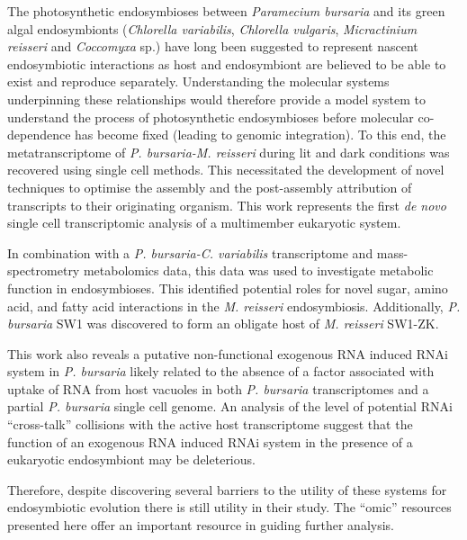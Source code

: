 The photosynthetic endosymbioses between \textit{Paramecium bursaria} and its green algal endosymbionts 
(\textit{Chlorella variabilis}, \textit{Chlorella vulgaris}, \textit{Micractinium reisseri} and \textit{Coccomyxa} sp.) 
have long been suggested to represent nascent endosymbiotic interactions 
as host and endosymbiont are believed to be able to exist and reproduce separately. 
Understanding the molecular systems underpinning these relationships would therefore 
provide a model system to understand the process of photosynthetic endosymbioses 
before molecular co-dependence has become fixed (leading to genomic integration).
To this end, the metatranscriptome of \textit{P. bursaria-M. reisseri} during 
lit and dark conditions was recovered using single cell methods. 
This necessitated the development of novel techniques to optimise the 
assembly and the post-assembly attribution of transcripts to their originating organism. 
This work represents the first \textit{de novo} single cell transcriptomic analysis of a multimember eukaryotic system.  


In combination with a \textit{P. bursaria-C. variabilis} transcriptome and 
mass-spectrometry metabolomics data, 
this data was used to investigate metabolic function in endosymbioses. 
This identified potential roles for novel sugar, amino acid, and 
fatty acid interactions in the \textit{M. reisseri} endosymbiosis.
Additionally, \textit{P. bursaria} SW1 was discovered to form an obligate host of
\textit{M. reisseri} SW1-ZK.

 
This work also reveals a putative non-functional exogenous RNA induced 
RNAi system in \textit{P. bursaria} likely related to the absence of a factor 
associated with uptake of RNA from host vacuoles in both \textit{P. bursaria}
transcriptomes and a partial \textit{P. bursaria} single cell genome.  
An analysis of the level of potential RNAi ``cross-talk'' 
collisions with the active host transcriptome suggest that the function of an 
exogenous RNA induced RNAi system in the presence of a eukaryotic endosymbiont may be deleterious.

 
Therefore, despite discovering several barriers to the utility of these systems for endosymbiotic 
evolution there is still utility in their study. The “omic'' resources presented here 
offer an important resource in guiding further analysis.

